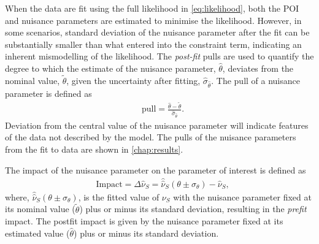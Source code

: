 When the data are fit using the full likelihood in \cref{eq:likelihood}, both the POI and nuisance parameters are estimated to minimise the likelihood. However, in some scenarios, standard deviation of the nuisance parameter after the fit can be substantially smaller than what entered into the constraint term, indicating an inherent mismodelling of the likelihood. The \emph{post-fit} pulls are used to quantify the degree to which the estimate of the nuisance parameter, $\hat{\theta}$, deviates from the nominal value, $\tilde{\theta}$, given the uncertainty after fitting, $\hat{\sigma}_{\hat{\theta}}$. The pull of a nuisance parameter is defined as
\begin{equation}
    \label{eq:nppull}
    \begin{aligned}
        & \mathrm{pull} = \frac{\hat{\theta} -\tilde{\theta}}{\hat{\sigma}_{\hat{\theta}}}.
    \end{aligned}
\end{equation}
Deviation from the central value of the nuisance parameter will indicate features of the data not described by the model. The pulls of the nuisance parameters from the fit to data are shown in \cref{chap:results}. 

The impact of the nuisance parameter on the parameter of interest is defined as
\begin{equation}
    \label{eq:npinpact}
    \begin{aligned}
        & \mathrm{Impact} = \Delta \hat{\nu}_{S} = \hat{\hat{\nu}}_S(\theta \pm \sigma_\theta) - \hat{\nu}_S,
    \end{aligned}
\end{equation}
where, $\hat{\hat{\nu}}_S(\theta \pm \sigma_\theta)$, is the fitted value of $\nu_S$ with the nuisance parameter fixed at its nominal value ($\tilde{\theta}$) plus or minus its standard deviation, resulting in the \emph{prefit} impact. The postfit impact is given by the nuisance parameter fixed at its estimated value ($\hat{\theta}$) plus or minus its standard deviation. 


